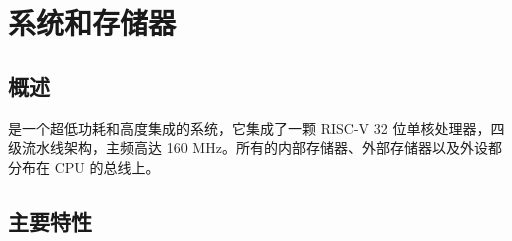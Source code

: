 \documentclass[main\_\_CN.tex]{subfiles}
\begin{document}

\ifglobal
\else
    {\let\clearpage\relax \listoftodos}
    \tableofcontents
\fi


\hypertarget{sysmem}{}
\chapter{系统和存储器}
\label{mod:sysmem}

\section{概述}

\chipname{} 是一个超低功耗和高度集成的系统，它集成了一颗 RISC-V 32 位单核处理器，四级流水线架构，主频高达 160 MHz。所有的内部存储器、外部存储器以及外设都分布在 CPU 的总线上。

\section{主要特性}
\end{document}
